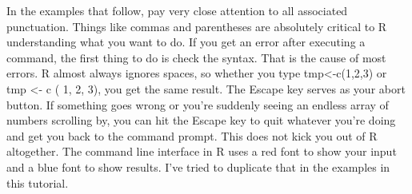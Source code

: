 In the examples that follow, pay very close attention to all associated punctuation. Things like commas and parentheses are absolutely critical to R understanding what you want to do. If you get an error after executing a command, the first thing to do is check the syntax. That is the cause of most errors. R almost always ignores spaces, so whether you type tmp<-c(1,2,3) or tmp <- c ( 1, 2, 3), you get the same result. 
The Escape key serves as your abort button. If something goes wrong or you're suddenly seeing an endless array of numbers scrolling by, you can hit the Escape key to quit whatever you're doing and get you back to the command prompt. This does not kick you out of R altogether. 
The command line interface in R uses a red font to show your input and a blue font to show results. I've tried to duplicate that in the examples in this tutorial. 


